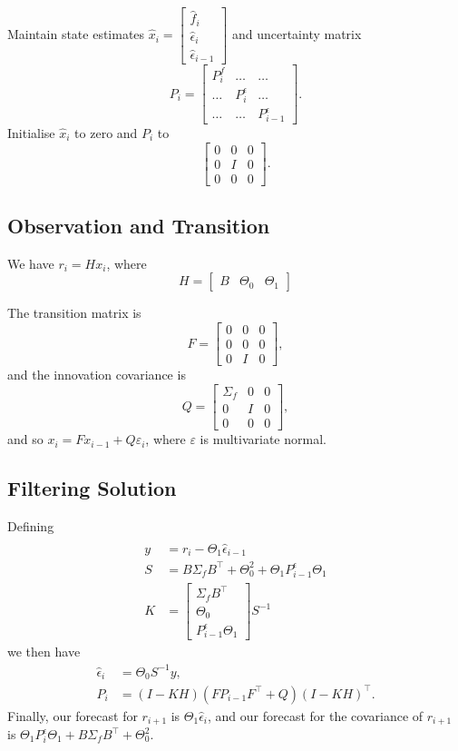 \documentclass{article}
\begin{document}
Maintain state estimates $\hat{x}_i = \left[\begin{matrix}\hat{f}_i \\ \hat{\epsilon}_i \\ \hat{\epsilon}_{i-1}\end{matrix}\right]$ and uncertainty matrix
$$P_i = \left[\begin{matrix}P^f_i&\ldots&\ldots\\\ldots&P^\epsilon_i&\ldots\\\ldots&\ldots&P^\epsilon_{i-1}\end{matrix}\right].$$
Initialise $\hat{x}_i$ to zero and $P_i$ to 
$$\left[\begin{matrix}0 & 0 & 0 \\ 0 & I & 0 \\ 0 & 0 & 0\end{matrix}\right].$$

\subsection{Observation and Transition}
We have $r_i = Hx_i$, where
$$H = \left[\begin{matrix}B & \Theta_0 & \Theta_1\end{matrix}\right]$$

The transition matrix is
$$F = \left[\begin{matrix}0 & 0 & 0 \\ 0 & 0 & 0 \\ 0 & I & 0\end{matrix}\right],$$
and the innovation covariance is
$$Q = \left[\begin{matrix}\Sigma_f & 0 & 0 \\ 0 & I & 0 \\ 0 & 0 & 0\end{matrix}\right],$$
and so $x_i = Fx_{i-1} + Q\varepsilon_i$, where $\varepsilon$ is multivariate normal.

\subsection{Filtering Solution}
Defining
\begin{align*}
\\	y				&= r_i - \Theta_1 \hat{\epsilon}_{i-1}
\\	S				&= B\Sigma_f B^\top + \Theta_0^2 + \Theta_1 P^\epsilon_{i-1}\Theta_1
\\	K				&= \left[\begin{matrix}\Sigma_f B^\top \\ \Theta_0 \\ P^\epsilon_{i-1} \Theta_1 \end{matrix}\right] S^{-1} 
\end{align*}
we then have
\begin{align*}
	\hat{\epsilon}_i&= \Theta_0 S^{-1} y,
\\	P_i		&= (I-KH) (F P_{i-1} F^\top + Q) (I-KH)^\top.
\end{align*}
Finally, our forecast for $r_{i+1}$ is $\Theta_1\hat{\epsilon}_i$, and our forecast for the covariance of $r_{i+1}$ is $\Theta_1 P^\epsilon_i \Theta_1 + B\Sigma_f B^\top+\Theta_0^2$.
\end{document}
